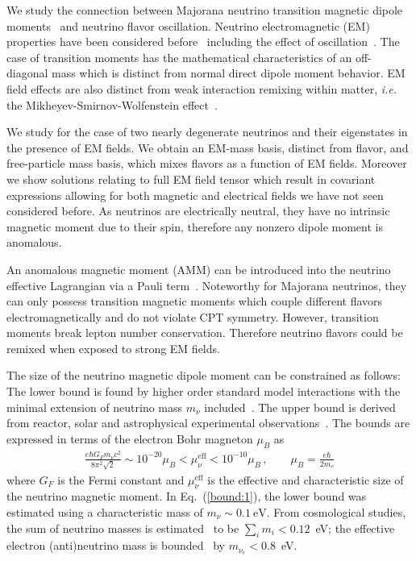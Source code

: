 \documentclass{ws-ijmpa}
\newcommand{\req}[1]{Eq.~(\ref{#1})}
\begin{document}
We study the connection between Majorana neutrino transition magnetic dipole moments~\cite{Fujikawa:1980yx,Shrock:1980vy,Shrock:1982sc} and neutrino flavor oscillation. Neutrino electromagnetic (EM) properties have been considered before~\cite{Schechter:1981hw,Giunti:2014ixa,Chukhnova:2019oum,Popov:2019nkr} including the effect of oscillation~\cite{Pal:1991pm,Elizalde:2004mw}. The case of transition moments has the mathematical characteristics of an off-diagonal mass which is distinct from normal direct dipole moment behavior. EM field effects are also distinct from weak interaction remixing within matter, {\it i.e.\/} the Mikheyev-Smirnov-Wolfenstein effect~\cite{Wolfenstein:1977ue,Mikheyev:1985zog,Smirnov:2003da}.

We study for the case of two nearly degenerate neutrinos and their eigenstates in the presence of EM fields. We obtain an EM-mass basis, distinct from flavor, and free-particle mass basis, which mixes flavors as a function of EM fields. Moreover we show solutions relating to full EM field tensor which result in covariant expressions allowing for both magnetic and electrical fields we have not seen considered before. As neutrinos are electrically neutral, they have no intrinsic magnetic moment due to their spin, therefore any nonzero dipole moment is anomalous.

An anomalous magnetic moment (AMM) can be introduced into the neutrino effective Lagrangian via a Pauli term~\cite{Steinmetz:2018ryf,Itzykson:1980rh,Schwartz:2014sze}. Noteworthy for Majorana neutrinos, they can only possess transition magnetic moments which couple different flavors electromagnetically and do not violate CPT symmetry. However, transition moments break lepton number conservation. Therefore neutrino flavors could be remixed when exposed to strong EM fields.

The size of the neutrino magnetic dipole moment can be constrained as follows: The lower bound is found by higher order standard model interactions with the minimal extension of neutrino mass $m_{\nu}$ included~\cite{Fujikawa:1980yx,Shrock:1980vy,Shrock:1982sc}. The upper bound is derived from reactor, solar and astrophysical experimental observations~\cite{Giunti:2015gga,Canas:2015yoa,Studenikin:2016ykv,AristizabalSierra:2021fuc}. The bounds are expressed in terms of the electron Bohr magneton $\mu_{B}$ as
\begin{align}
\label{bound:1}
\frac{e\hbar G_{F}m_{\nu}c^{2}}{8\pi^{2}\sqrt{2}} \sim 10^{-20}\mu_{B}<\mu_{\nu}^\mathrm{eff}<10^{-10}\mu_{B}\,,\qquad\mu_{B}=\frac{e\hbar}{2m_{e}}
\end{align}
where $G_{F}$ is the Fermi constant and $\mu_{\nu}^\mathrm{eff}$ is the effective and characteristic size of the neutrino magnetic moment. In \req{bound:1}, the lower bound was estimated using a characteristic mass of $m_{\nu}\sim0.1~\mathrm{eV}$. From cosmological studies, the sum of neutrino masses is estimated~\cite{Planck:2018vyg} to be $\sum_{i}m_{i}<0.12$~eV; the effective electron (anti)neutrino mass is bounded~\cite{KATRIN:2021uub} by $m_{\nu_{e}}<0.8$~eV.
\end{document}
